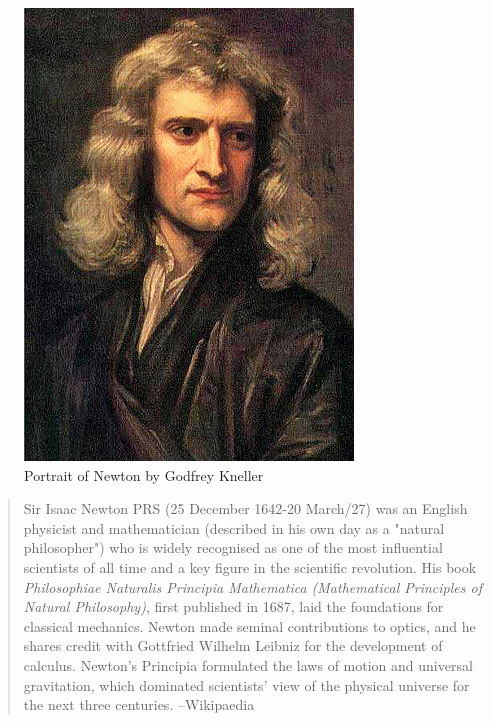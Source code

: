 \newpage %
\thispagestyle{empty}
\begin{figure}[H]
\centering
\includegraphics[scale=.5]{src/images/lbk-graphics/portraits/newton-wiki.jpg}
\caption*{Portrait of Newton by Godfrey Kneller}
\end{figure}


\begin{small}
\begin{quote}
Sir Isaac Newton PRS (25 December 1642-20 March/27)
was an English physicist and mathematician\lbk 
(described in
his own day as a "natural philosopher") who is widely
recognised as one of the most influential scientists of 
all
time and a key figure in the scientific revolution. 
His book \textsl{Philosophiae Naturalis Principia Mathematica
(Mathematical Principles of Natural Philosophy)}, first
published in 1687, laid the foundations for classical
mechanics. Newton made seminal contributions to optics,
and he shares credit with Gottfried Wilhelm Leibniz for
the development of calculus.
\enlargethispage{1\bsk}
Newton's Principia formulated the laws of motion and
universal gravitation, which dominated scientists' view
of the physical universe for the next three centuries.
\hfill --Wikipaedia
\end{quote}
\end{small}

\newpage


